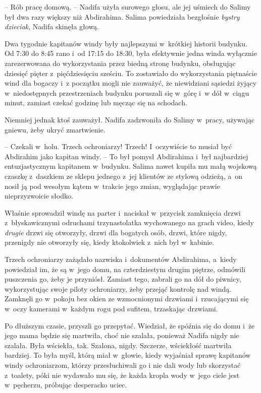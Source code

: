\documentclass[oneside,polish,11pt,sfheadings]{mwbk}
\begin{document}
-- Rób pracę domową. -- Nadifa użyła surowego głosu, ale jej uśmiech do
Salimy był dwa razy większy niż Abdirahima. Salima powiedziała
bezgłośnie \textit{bystry dzieciak}, Nadifa skinęła głową.

Dwa tygodnie kapitanów windy były najlepszymi w~krótkiej historii
budynku. Od 7:30 do 8:45 rano i~od 17:15 do 18:30, była efektywnie jedna
winda wyłącznie zarezerwowana do wykorzystania przez biedną stronę
budynku, obsługując dziesięć pięter z~pięćdziesięciu sześciu. To
zostawiało do wykorzystania piętnaście wind dla bogaczy i~z początku
mogli nie zauważyć, że niewidziani sąsiedzi żyjący w~niedostępnych
przestrzeniach budynku poruszali się w~górę i~w dół w~ciągu minut,
zamiast czekać godzinę lub męcząc się na schodach.

Niemniej jednak ktoś zauważył. Nadifa zadzwoniła do Salimy w~pracy,
używając gniewu, żeby ukryć zmartwienie. 

-- Czekali w~holu. Trzech
ochroniarzy! Trzech! I~oczywiście to musiał być Abdirahim jako kapitan
windy. -- To był pomysł Abdirahima i~był najbardziej entuzjastycznym
kapitanem w~budynku. Salima nawet kupiła mu małą wojskową czaszkę z~daszkiem ze sklepu jednego z~jej klientów ze stylową odzieżą, a~on nosił
ją pod wesołym kątem w~trakcie jego zmian, wyglądając prawie
nieprzyzwoicie słodko.

Właśnie sprowadził windę na parter i~naciskał w~przycisk zamknięcia
drzwi z~błyskawicznymi odruchami trzynastolatka wychowanego na grach
video, kiedy \textit{drugie} drzwi się otworzyły, drzwi dla bogatych osób,
drzwi, które nigdy, przenigdy nie otworzyły się, kiedy ktokolwiek z~nich
był w~kabinie.

Trzech ochroniarzy zażądało nazwiska i~dokumentów Abdirahima, a~kiedy
powiedział im, że są w~jego domu, na czterdziestym drugim piętrze,
odmówili puszczenia go, żeby je przyniósł. Zamiast tego, zabrali go na
dół do piwnicy, wykorzystując swoje piloty ochroniarzy, żeby przejąć
kontrolę nad windą. Zamknęli go w~pokoju bez okien ze wzmocnionymi
drzwiami i~rzucającymi się w~oczy kamerami w~każdym rogu pod sufitem,
trzaskając drzwiami.

Po dłuższym czasie, przyszli go przepytać. Wiedział, że spóźnia się do
domu i~że jego mama będzie się martwiła, choć nie szalała, ponieważ
Nadifa nigdy nie szalała. Była wściekła, tak. Szalona, nigdy. Szczerze,
wściekłość martwiła bardziej. To była myśl, którą miał w~głowie, kiedy
wyjaśniał sprawę kapitanów windy ochroniarzom, którzy przesłuchiwali go
i nie dali wody lub skorzystać z~toalety, póki nie wydawało mu się, że
każda kropla wody w~jego ciele jest w~pęcherzu, próbując desperacko
uciec.
\end{document}
